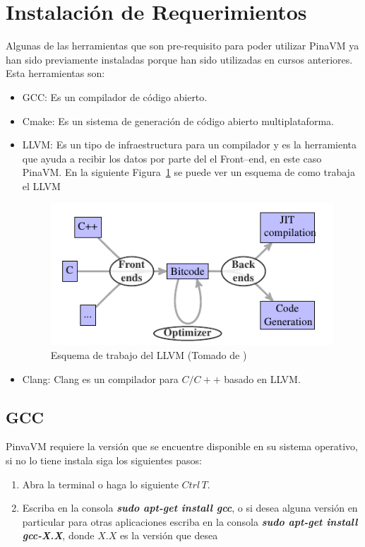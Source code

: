 \documentclass[12pt,graphicx,caption,rotating]{article}
\begin{document}
\section{Instalación de Requerimientos}
\noindent
Algunas de las herramientas que son pre-requisito para poder utilizar PinaVM ya han sido previamente instaladas porque han sido utilizadas en cursos anteriores. Esta herramientas son:
\begin{itemize}
 \item GCC: Es un compilador de código abierto.
 \item Cmake: Es un sistema de generación de código abierto multiplataforma.
 \item LLVM: Es un tipo de infraestructura para un compilador y es la herramienta que ayuda a recibir los datos por parte del el Front–end, en este caso PinaVM. En la siguiente Figura~\ref{fig1} se puede ver un esquema de como trabaja el LLVM
 \begin{figure} [H]
 \center
  \includegraphics[scale=0.5]{llvm.png}
  \caption{Esquema de trabajo del LLVM (Tomado de \cite{page2})}
  \label{fig1}
 \end{figure}
 \item Clang: Clang es un compilador para $C / C + +$ basado en LLVM.
\end{itemize}

\subsection{GCC}
\noindent
PinvaVM requiere la versión que se encuentre disponible en su sistema operativo, si no lo tiene instala siga los siguientes pasos:
\begin{enumerate}
 \item Abra la terminal o haga lo siguiente $Ctrl \, T$.
 \item Escriba en la consola \textbf{\textit{sudo apt-get install gcc}}, o si desea alguna versión en particular para otras aplicaciones escriba en la consola \textbf{\textit{sudo apt-get install gcc-X.X}}, donde $X.X$ es la versión que desea
\end{enumerate}
\end{document}
